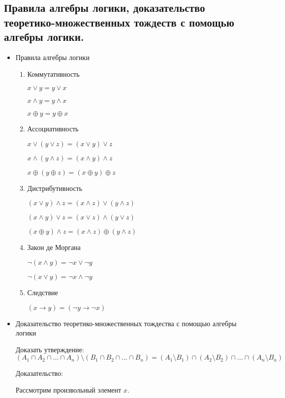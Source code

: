 \subsection{Правила алгебры логики, доказательство теоретико-множественных тождеств с помощью алгебры логики.}

\begin{itemize}
	\item Правила алгебры логики
	\begin{enumerate}
		\item Коммутативность
		
		$x \vee y = y \vee x$
		
		$x \wedge y = y \wedge x$
		
		$x \oplus y = y \oplus x$

		\item Ассоциативность
		
		$x \vee (y \vee z)  = (x \vee y) \vee z$
		
		$x \wedge (y \wedge z)  = (x \wedge y) \wedge z$
		
		$x \oplus (y \oplus z)  = (x \oplus y) \oplus z$
		
		\item Дистрибутивность
		
		$(x \vee y) \wedge z = (x \wedge z) \vee (y \wedge z)$
		
		$(x \wedge y) \vee z = (x \vee z) \wedge (y \vee z)$
		
		$(x \oplus y) \wedge z = (x \wedge z) \oplus (y \wedge z)$
		
		\item Закон де Моргана
		
		$\neg(x \wedge y) = \neg x \vee \neg y$
		
		$\neg(x \vee y) = \neg x \wedge \neg y$
		
		\item Следствие
		
		$(x \to y) = (\neg y \to \neg x)$
	\end{enumerate}
	
	\item Доказательство теоретико-множественных тождества с помощью алгебры логики
	
	Доказать утверждение: $(A_1 \cap A_2 \cap ... \cap A_n) \setminus (B_1 \cap B_2 \cap ... \cap B_n) = (A_1 \setminus B_1) \cap (A_2 \setminus B_2) \cap ... \cap (A_n \setminus B_n)$
	
	Доказательство:
	
	Рассмотрим произвольный элемент $x$.
	

\end{itemize}
